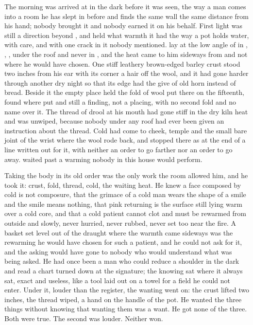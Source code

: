 
The morning was arrived at in the dark before it was seen, the way a man comes into a room he has slept in before and finds the same wall the same distance from his hand; nobody brought it and nobody earned it on his behalf. First light was still a direction beyond , and  held what warmth it had the way a pot holds water, with care, and with one crack in it nobody mentioned.  lay at the low angle of  in , , , under the roof and never in , and the heat came to him sideways from  and not where he would have chosen. One stiff leathery brown-edged barley crust stood two inches from his ear with its corner a hair off the wool, and it had gone harder through another dry night so that its edge had the give of old horn instead of bread. Beside it the empty place held the fold of wool put there on the fifteenth, found where put and still a finding, not a placing, with no second fold and no name over it. The thread of drool at his mouth had gone stiff in the dry kiln heat and was unwiped, because nobody under any roof had ever been given an instruction about the thread. Cold had come to cheek, temple and the small bare joint of the wrist where the wool rode back, and stopped there as at the end of a line written out for it, with neither an order to go farther nor an order to go away.  waited past a warming nobody in this house would perform.

Taking the body in its old order was the only work the room allowed him, and he took it: crust, fold, thread, cold, the waiting heat. He knew a face composed by cold is not composure, that the grimace of a cold man wears the shape of a smile and the smile means nothing, that pink returning is the surface still lying warm over a cold core, and that a cold patient cannot clot and must be rewarmed from outside and slowly, never hurried, never rubbed, never set too near the fire. A basket set level out of the draught where the warmth came sideways was the rewarming he would have chosen for such a patient, and he could not ask for it, and the asking would have gone to nobody who would understand what was being asked. He had once been a man who could reduce a shoulder in the dark and read a chart turned down at the signature; the knowing sat where it always sat, exact and useless, like a tool laid out on a towel for a field he could not enter. Under it, louder than the register, the wanting went on: the crust lifted two inches, the thread wiped, a hand on the handle of the pot. He wanted the three things without knowing that wanting them was a want. He got none of the three. Both were true. The second was louder. Neither won.

